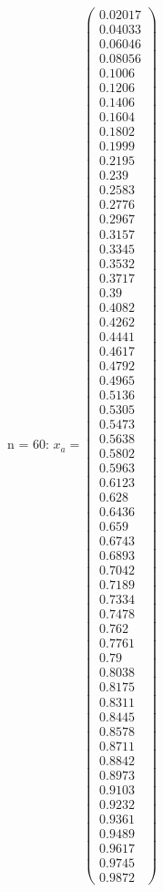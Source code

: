 \documentclass{udpreport}
\begin{document}
\begin{enumerate}
\begin{enumerate}
\begin{itemize}
\begin{itemize}
				n = 60: $x_{a} =\left(\begin{array}{c} 0.02017\\ 0.04033\\ 0.06046\\ 0.08056\\ 0.1006\\ 0.1206\\ 0.1406\\ 0.1604\\ 0.1802\\ 0.1999\\ 0.2195\\ 0.239\\ 0.2583\\ 0.2776\\ 0.2967\\ 0.3157\\ 0.3345\\ 0.3532\\ 0.3717\\ 0.39\\ 0.4082\\ 0.4262\\ 0.4441\\ 0.4617\\ 0.4792\\ 0.4965\\ 0.5136\\ 0.5305\\ 0.5473\\ 0.5638\\ 0.5802\\ 0.5963\\ 0.6123\\ 0.628\\ 0.6436\\ 0.659\\ 0.6743\\ 0.6893\\ 0.7042\\ 0.7189\\ 0.7334\\ 0.7478\\ 0.762\\ 0.7761\\ 0.79\\ 0.8038\\ 0.8175\\ 0.8311\\ 0.8445\\ 0.8578\\ 0.8711\\ 0.8842\\ 0.8973\\ 0.9103\\ 0.9232\\ 0.9361\\ 0.9489\\ 0.9617\\ 0.9745\\ 0.9872 \end{array}\right)$

\end{itemize}
\end{itemize}
\end{enumerate}
\end{enumerate}
\end{document}
